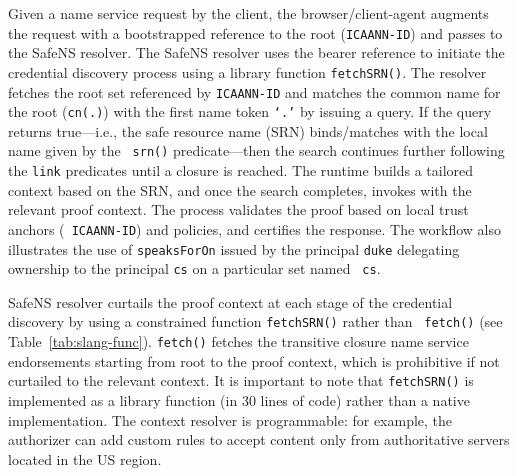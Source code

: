 Given a name service request by the client, the browser/client-agent augments
the request with a bootstrapped reference to the root ({\tt ICAANN-ID})
 and passes to the SafeNS resolver. The SafeNS resolver uses
the bearer reference to initiate the credential discovery process using a
 library function {\tt fetchSRN()}. The resolver fetches the
root set referenced by {\tt ICAANN-ID} and matches the common name for the root
({\tt cn(.)}) with the first name token {\tt `.'} by issuing a 
query. If the  query returns true---i.e., the safe resource name
(SRN) binds/matches with the  local name given by the {\tt
srn()} predicate---then the search continues further following the {\tt link}
predicates until a closure is reached. The  runtime builds a
tailored context based on the SRN, and once the search completes,
 invokes  with the relevant proof context. The
 process validates the proof based on local trust anchors ({\tt
ICAANN-ID}) and policies, and certifies the response. The workflow also
illustrates the use of {\tt speaksForOn} issued by the principal {\tt duke}
delegating ownership to the principal {\tt cs} on a particular set named {\tt
cs}.

SafeNS resolver curtails the proof context at each stage of the credential
discovery by using a constrained function {\tt fetchSRN()} rather than {\tt
fetch()} (see Table~\ref{tab:slang-func}). {\tt fetch()} fetches the
transitive closure name service endorsements starting from root to the proof
context, which is prohibitive if not curtailed to the relevant context. It is
important to note that {\tt fetchSRN()} is implemented as a 
library function (in 30 lines of code) rather than a native implementation. The
context resolver is programmable: for example, the authorizer can add custom
rules to accept content only from authoritative servers located in the US
region.
